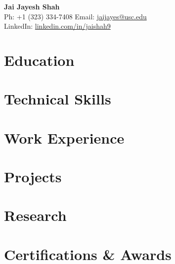 \documentclass[letterpaper,10pt]{article}
\begin{document}
\begin{center}
    {\LARGE \textbf{Jai Jayesh Shah}} \\
    \vspace{5pt}
    \small
    Ph: +1 (323) 334-7408 \quad Email: \href{mailto:jaijayes@usc.edu}{jaijayes@usc.edu} \\
    LinkedIn: \href{https://www.linkedin.com/in/jaishah9}{linkedin.com/in/jaishah9} \\
    \vspace{-8pt}
\end{center}

\section*{Education}

\section*{Technical Skills}

\section*{Work Experience}

\section*{Projects}

\section*{Research}

\section*{Certifications \& Awards}
\begin{itemize} \itemsep -2pt
\end{itemize}
\end{document}
